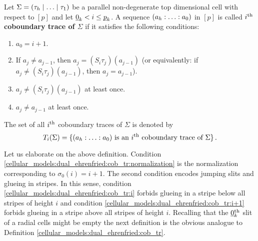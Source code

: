 \begin{defi}
    \label{cellular_models:dual_ehrenfried:cob_tr}
    Let $\Sigma = \inhom$ be a parallel non-degenerate top dimensional cell with respect to $[p]$ and let $\underline{\smash{0}}_k < i \le \underline{\smash{p}}_k$.
    A sequence $\homog[a]$ in $[p]$ is called $i^{\text{th}}$ {\bfseries coboundary trace of $\Sigma$} if it satisfies the following conditions:
    \begin{enumerate}
        \item \label{cellular_models:dual_ehrenfried:cob_tr:normalization} $a_0 = i+1$.
        \item \label{cellular_models:dual_ehrenfried:cob_tr:choice} If $a_j \neq a_{j-1}$, then $a_j = (S_i\tau_j)(a_{j-1})$
                    (or equivalently: if $a_j \neq (S_i\tau_j)(a_{j-1})$, then $a_j = a_{j-1}$).
        \item \label{cellular_models:dual_ehrenfried:cob_tr:i} $a_j \neq (S_i\tau_j)(a_{j-1})$ at least once.
        \item \label{cellular_models:dual_ehrenfried:cob_tr:i+1} $a_j \neq a_{j-1}$ at least once.
    \end{enumerate}
    The set of all $i^{\text{th}}$ coboundary traces of $\Sigma$ is denoted by
    \[
        T_i(\Sigma) = \{ (a_h : \ldots : a_0) \text{ is an $i\Th$ coboundary trace of $\Sigma$} \} \,.
    \]
\end{defi}

Let us elaborate on the above definition.
Condition \ref{cellular_models:dual_ehrenfried:cob_tr:normalization} is the normalization corresponding to $\sigma_0(i) = i+1$.
The second condition encodes jumping slits and glueing in stripes.
In this sense, condition \ref{cellular_models:dual_ehrenfried:cob_tr:i} forbids glueing in a stripe below all stripes of height $i$ and
condition \ref{cellular_models:dual_ehrenfried:cob_tr:i+1} forbids glueing in a stripe above all stripes of height $i$.
Recalling that the $\underline{\smash{0}}_k^{\text{th}}$ slit of a radial cells might be empty the next definition is the obvious analogue to Definition \ref{cellular_models:dual_ehrenfried:cob_tr}.

